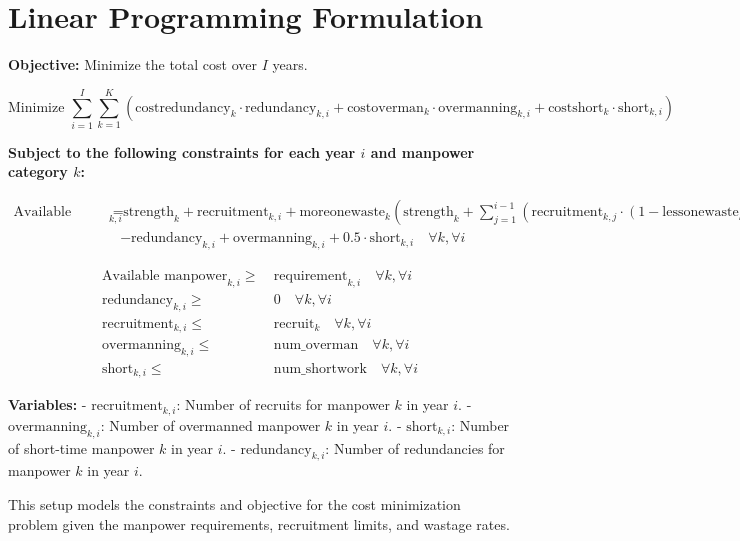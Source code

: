 \documentclass{article}
\begin{document}
\section*{Linear Programming Formulation}

\textbf{Objective:} Minimize the total cost over \(I\) years.

\[
\text{Minimize } \sum_{i=1}^{I} \sum_{k=1}^{K} \left(
\text{costredundancy}_k \cdot \text{redundancy}_{k,i}
+ \text{costoverman}_k \cdot \text{overmanning}_{k,i}
+ \text{costshort}_k \cdot \text{short}_{k,i}
\right)
\]

\textbf{Subject to the following constraints for each year \(i\) and manpower category \(k\):}

\begin{align*}
\text{Available manpower}_{k,i} = & \ \text{strength}_k + \text{recruitment}_{k,i} + \text{moreonewaste}_k \left(\text{strength}_k + \sum_{j=1}^{i-1} ( \text{recruitment}_{k,j} \cdot (1-\text{lessonewaste}_k) )\right) \\
& - \text{redundancy}_{k,i} + \text{overmanning}_{k,i} + 0.5 \cdot \text{short}_{k,i} \quad \forall k, \forall i
\end{align*}

\begin{align*}
\text{Available manpower}_{k,i} \geq & \ \text{requirement}_{k,i} \quad \forall k, \forall i\\
\text{redundancy}_{k,i} \geq & \ 0 \quad \forall k, \forall i\\
\text{recruitment}_{k,i} \leq & \ \text{recruit}_k \quad \forall k, \forall i\\
\text{overmanning}_{k,i} \leq & \ \text{num\_overman} \quad \forall k, \forall i\\
\text{short}_{k,i} \leq & \ \text{num\_shortwork} \quad \forall k, \forall i
\end{align*}

\textbf{Variables:}
- \(\text{recruitment}_{k,i}\): Number of recruits for manpower \(k\) in year \(i\).
- \(\text{overmanning}_{k,i}\): Number of overmanned manpower \(k\) in year \(i\).
- \(\text{short}_{k,i}\): Number of short-time manpower \(k\) in year \(i\).
- \(\text{redundancy}_{k,i}\): Number of redundancies for manpower \(k\) in year \(i\).

This setup models the constraints and objective for the cost minimization problem given the manpower requirements, recruitment limits, and wastage rates.
\end{document}
